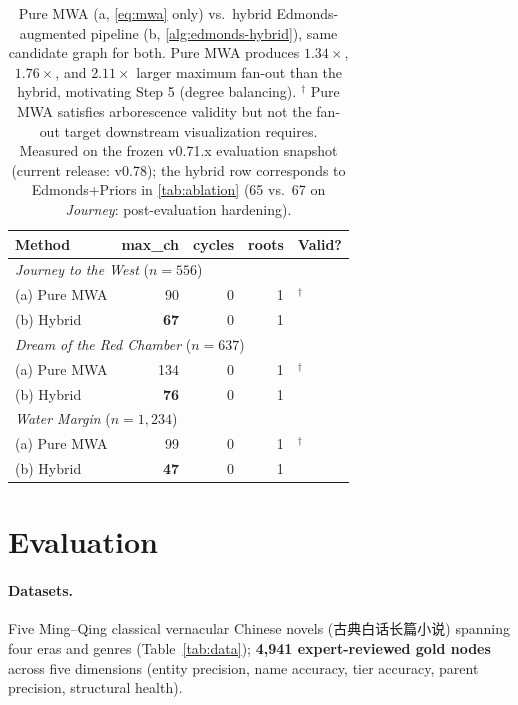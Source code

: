 \documentclass[11pt]{article}
\newenvironment{CJK}[2]{}{}
\newcommand{\cmark}{\ding{51}}
\begin{document}
\begin{table}[h]
\centering
\scriptsize
\setlength{\tabcolsep}{4pt}
\begin{tabular}{lrrrl}
\toprule
\textbf{Method} & \textbf{max\_ch} & \textbf{cycles} & \textbf{roots} & \textbf{Valid?} \\
\midrule
\multicolumn{5}{l}{\textit{Journey to the West} ($n = 556$)} \\
\quad (a) Pure MWA & 90 & 0 & 1 & \cmark$^\dagger$ \\
\quad (b) Hybrid & \textbf{67} & 0 & 1 & \cmark \\
\midrule
\multicolumn{5}{l}{\textit{Dream of the Red Chamber} ($n = 637$)} \\
\quad (a) Pure MWA & 134 & 0 & 1 & \cmark$^\dagger$ \\
\quad (b) Hybrid & \textbf{76} & 0 & 1 & \cmark \\
\midrule
\multicolumn{5}{l}{\textit{Water Margin} ($n = 1{,}234$)} \\
\quad (a) Pure MWA & 99 & 0 & 1 & \cmark$^\dagger$ \\
\quad (b) Hybrid & \textbf{47} & 0 & 1 & \cmark \\
\bottomrule
\end{tabular}
\caption{Pure MWA (a, \autoref{eq:mwa} only) vs.\ hybrid Edmonds-augmented pipeline (b, \autoref{alg:edmonds-hybrid}), same candidate graph for both. Pure MWA produces $1.34\times$, $1.76\times$, and $2.11\times$ larger maximum fan-out than the hybrid, motivating Step 5 (degree balancing).
$^\dagger$ Pure MWA satisfies arborescence validity but not the fan-out target downstream visualization requires. Measured on the frozen v0.71.x evaluation snapshot (current release: v0.78); the hybrid row corresponds to Edmonds+Priors in \autoref{tab:ablation} (65 vs.\ 67 on \textit{Journey}: post-evaluation hardening).}
\label{tab:pure-mwa-ablation}
\end{table}

\section{Evaluation}
\label{sec:eval}

\paragraph{Datasets.} Five Ming--Qing classical vernacular Chinese novels (\begin{CJK}{UTF8}{gbsn}古典白话长篇小说\end{CJK}) spanning four eras and genres (Table~\ref{tab:data}); \textbf{4{,}941 expert-reviewed gold nodes} across five dimensions (entity precision, name accuracy, tier accuracy, parent precision, structural health).
\end{document}
